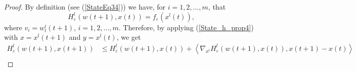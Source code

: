 \documentclass[11pt]{article}
\numberwithin{equation}{section}
\begin{document}
\begin{proof}
By definition (see (\ref{StateEq34})) we have, for $i=1,2, \ldots, m$, that
\begin{equation*}
	H^l_{\varepsilon}(w(t+1),x(t)) = f_{\varepsilon}(x^l(t)) ,
\end{equation*}
where $v_i=w^i_l(t+1)$, $i=1,2, \ldots, m$. Therefore, by applying (\ref{State_h_prop4}) with $x=x^l(t+1)$ and $y=x^l(t)$, we get
\begin{align*}
	H^l_{\varepsilon}(w(t+1),x(t+1)) 
	&\leq H^l_{\varepsilon}(w(t+1),x(t)) + \left\langle \nabla_{x^l} H^l_{\varepsilon}(w(t+1),x(t)), x(t+1)-x(t) \right\rangle \\

\end{align*}
\end{proof}
\end{document}
